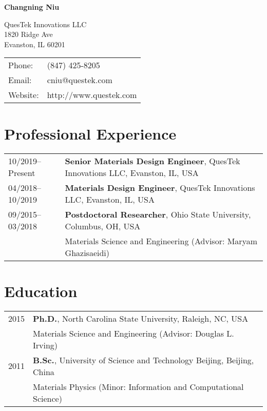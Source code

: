 \documentclass[letterpaper,11pt]{article}
\def\name{Changning Niu}
\begin{document}
\thispagestyle{empty}
\centerline{\huge \bf \sc \name}

\vspace{0.25in}

\begin{minipage}{0.50\linewidth}
  QuesTek Innovations LLC \\
  1820 Ridge Ave\\
  Evanston, IL 60201
\end{minipage}
\begin{minipage}{0.50\linewidth}
  \begin{tabular}{ll}
    Phone: & (847) 425-8205 \\
    Email: & cniu@questek.com \\
    Website: & http://www.questek.com \\
  \end{tabular}
\end{minipage}


\section*{Professional Experience}

\begin{tabular}{ll}
10/2019--Present & \textbf{Senior Materials Design Engineer}, QuesTek Innovations LLC, Evanston, IL, USA\\
04/2018--10/2019 & \textbf{Materials Design Engineer}, QuesTek Innovations LLC, Evanston, IL, USA\\
09/2015--03/2018 & \textbf{Postdoctoral Researcher}, Ohio State University, Columbus, OH, USA \\
		   & Materials Science and Engineering (Advisor: Maryam Ghazisaeidi)
\end{tabular}


\section*{Education}

\begin{tabular}{ll}
	2015 & {\bf Ph.D.}, North Carolina State University, Raleigh, NC, USA \\
	     & Materials Science and Engineering (Advisor: Douglas L. Irving) \\
	2011 & {\bf B.Sc.}, University of Science and Technology Beijing, Beijing, China \\
		 & Materials Physics (Minor: Information and Computational Science) \\
\end{tabular}
\end{document}
